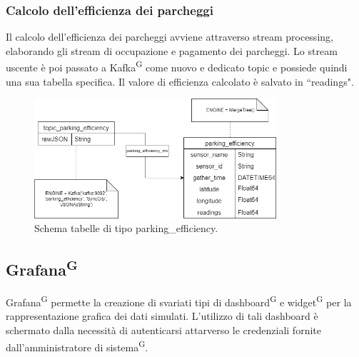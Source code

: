 \documentclass[8pt]{article}
\newcommand{\glossterm}[1]{#1\textsuperscript{G}} %
\begin{document}
\subsubsection{Calcolo dell'efficienza dei parcheggi}
Il calcolo dell'efficienza dei parcheggi avviene attraverso stream processing, elaborando gli stream di occupazione e pagamento dei parcheggi. Lo stream uscente è poi passato a \glossterm{Kafka} come nuovo e dedicato topic e possiede quindi una sua tabella specifica. Il valore di efficienza calcolato è salvato in ``readings".
\begin{figure}[h!]
    \centering
    \includegraphics[width=0.8\textwidth]{images_st/tabelle_parking_efficiency.png}
    \caption{Schema tabelle di tipo parking\_efficiency.}
    \label{fig:Schema tabelle di tipo parking_efficiency}
\end{figure}
\clearpage
\subsection{\glossterm{Grafana}}
\glossterm{Grafana} permette la creazione di svariati tipi di \glossterm{dashboard} e \glossterm{widget} per la rappresentazione grafica dei dati simulati. L'utilizzo di tali dashboard è schermato dalla necessità di autenticarsi attarverso le credenziali fornite dall'amministratore di \glossterm{sistema}.
\end{document}
